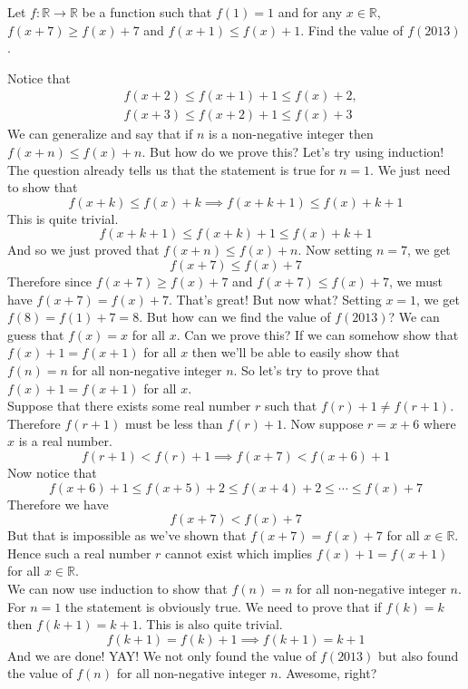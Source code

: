\documentclass[11pt,numbers=noenddot,svgnames,dvipsnames]{scrartcl}
\begin{document}
\begin{example}[BDMO]
    Let $f\colon \mathbb{R} \to \mathbb{R}$ be a function such that $f(1) = 1$ and for any $x\in \mathbb{R}$, 
    $f(x+7)\geq f(x) + 7$ and $f(x + 1)\leq f(x) + 1$. Find the value of $f(2013)$.
\end{example}
\begin{sol}
    Notice that 
    \begin{align*}
        & f(x + 2) \leq f(x + 1) + 1 \leq f(x) + 2, \\
        & f(x + 3) \leq f(x + 2) + 1 \leq f(x) + 3
    \end{align*}
    We can generalize and say that if $n$ is a non-negative integer then $f(x + n) \leq f(x) + n$. 
    But how do we prove this? Let's try using induction!\\
    The question already tells us that the statement is true for $n=1$. We just need to show 
    that 
    \[
        f(x + k)\leq f(x) + k \implies f(x + k + 1)\leq f(x) + k + 1
    \]
    This is quite trivial.
    \[
        f(x + k + 1 )\leq f(x + k) + 1 \leq f(x) + k + 1
    \]
    And so we just proved that $f(x+n) \leq f(x) + n$. Now setting $n=7$, we get 
    \[
        f(x + 7) \leq f(x) + 7
    \]
    Therefore since $f(x+7) \geq f(x)+7$ and $f(x+7) \leq f(x) + 7$, we must have $f(x + 7) = f(x) + 7$. 
    That's great! But now what? Setting $x=1$, we get $f(8) = f(1) + 7 = 8$. But how can we find the value of $f(2013)$? 
    We can guess that $f(x) = x$ for all $x$. Can we prove this? If we can somehow show that $f(x) + 1 = f(x+1)$ for all $x$ 
    then we'll be able to easily show that $f(n) = n$ for all non-negative integer $n$. So let's try to prove that 
    $f(x) + 1 = f(x + 1)$ for all $x$. \\
    Suppose that there exists some real number $r$ such that $f(r) + 1 \neq f(r + 1)$. Therefore $f(r+1)$ must be 
    less than $f(r) + 1$. Now suppose $r = x + 6$ where $x$ is a real number. 
    \[
        f(r + 1) < f(r) + 1 \implies f(x+7) < f(x + 6) + 1
    \]
    Now notice that 
    \[
        f(x + 6) + 1 \leq f(x + 5) + 2 \leq f(x + 4) + 2 \leq \cdots \leq f(x) + 7
    \]
    Therefore we have 
    \[
        f(x + 7) < f(x) + 7
    \]
    But that is impossible as we've shown that $f(x + 7) = f(x) + 7$  for all $x \in \mathbb{R}$. 
    Hence such a real number $r$ cannot exist which implies $f(x) + 1 = f(x + 1)$ for all $x \in \mathbb{R}$. \\
    We can now use induction to show that $f(n) = n$ for all non-negative integer $n$. For $n=1$ the statement 
    is obviously true. We need to prove that if $f(k) = k$ then $f(k+1) = k + 1$. This is also quite trivial. 
    \[
        f(k + 1) = f(k) + 1 \implies f(k + 1) = k + 1
    \]
    And we are done! YAY! We not only found the value of $f(2013)$ but also found the value of $f(n)$ for all 
    non-negative integer $n$. Awesome, right?
\end{sol}
\end{document}
